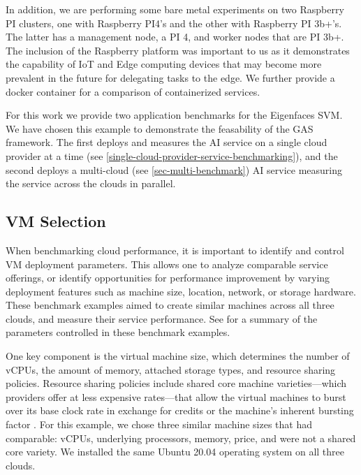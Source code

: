 In addition, we are performing some bare metal experiments on two
Raspberry PI clusters, one with Raspberry PI4's and the other with
Raspberry PI 3b+'s. The latter has a management node, a PI 4, and
worker nodes that are PI 3b+. The inclusion of the Raspberry platform
was important to us as it demonstrates the capability of IoT and Edge
computing devices that may become more prevalent in the future for
delegating tasks to the edge. We further provide a docker container
for a comparison of containerized services.

For this work we provide two application benchmarks for the Eigenfaces
SVM. We have chosen this example to demonstrate the feasability of the
GAS framework.  The first deploys and measures the AI service on a
single cloud provider at a time
(see \ref{single-cloud-provider-service-benchmarking}), and the second
deploys a multi-cloud (see \ref{sec-multi-benchmark}) AI service
measuring the service across the clouds in parallel.




\subsection{VM Selection}\label{vm-selection}

When benchmarking cloud performance, it is important to identify and
control VM deployment parameters. This allows one to analyze
comparable service offerings, or identify opportunities for
performance improvement by varying deployment features such as machine
size, location, network, or storage hardware. These benchmark examples
aimed to create similar machines across all three clouds, and measure
their service performance. See  for a summary of the
parameters controlled in these benchmark examples.

One key component is the virtual machine size, which determines the
number of vCPUs, the amount of memory, attached storage types, and
resource sharing policies. Resource sharing policies include shared
core machine varieties—which providers offer at less expensive
rates—that allow the virtual machines to burst over its base clock
rate in exchange for credits or the machine's inherent bursting factor
\cite{amazon-instances,google-instances}. For this example, we chose
three similar machine sizes that had comparable: vCPUs, underlying
processors, memory, price, and were not a shared core variety. We
installed the same Ubuntu 20.04 operating system on all three clouds.

